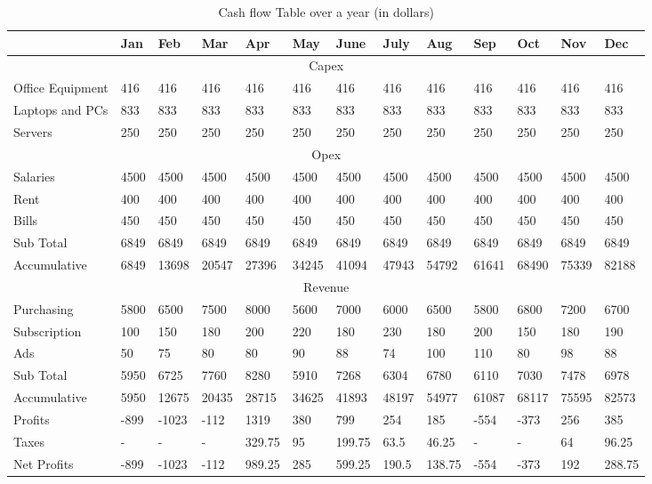 \begin{table}[H]
\centering
\caption{Cash flow Table over a year (in dollars)}
\begin{adjustbox}{angle=90}
\begin{tabular}[t]{ | l | l | l | l | l | l | l | l | l | l | l | l | l |}
\hline
 & Jan & Feb & Mar & Apr & May & June & July & Aug & Sep & Oct & Nov & Dec \\
\hline
\multicolumn{13}{|c|}{Capex}  \\
\hline
Office Equipment & 416 & 416 & 416 & 416 & 416 & 416 & 416 & 416 & 416 & 416 & 416 & 416 \\
\hline
Laptops and PCs & 833 & 833 & 833 & 833 & 833 & 833 & 833 & 833 & 833 & 833 & 833 & 833 \\
\hline
Servers & 250 & 250 & 250 & 250 & 250 & 250 & 250 & 250 & 250 & 250 & 250 & 250 \\
\hline
\multicolumn{13}{|c|}{Opex}  \\
\hline
Salaries & 4500 & 4500 & 4500 & 4500 & 4500 & 4500 & 4500 & 4500 & 4500 & 4500 & 4500 & 4500 \\
\hline
Rent & 400 & 400 & 400 & 400 & 400 & 400 & 400 & 400 & 400 & 400 & 400 & 400 \\
\hline
Bills & 450 & 450 & 450 & 450 & 450 & 450 & 450 & 450 & 450 & 450 & 450 & 450 \\
\hline
Sub Total & 6849 & 6849 & 6849 & 6849 & 6849 & 6849 & 6849 & 6849 & 6849 & 6849 & 6849 & 6849 \\
\hline
Accumulative & 6849 & 13698 & 20547 & 27396 & 34245 & 41094 & 47943 & 54792 & 61641 & 68490 & 75339 & 82188 \\
\hline
\multicolumn{13}{|c|}{Revenue}  \\
\hline
Purchasing & 5800 & 6500 & 7500 & 8000 & 5600 & 7000 & 6000 & 6500 & 5800 & 6800 & 7200 & 6700 \\
\hline
Subscription & 100 & 150 & 180 & 200 & 220 & 180 & 230 & 180 & 200 & 150 & 180 & 190 \\
\hline
Ads & 50 & 75 & 80 & 80 & 90 & 88 & 74 & 100 & 110 & 80 & 98 & 88 \\
\hline
Sub Total  & 5950 & 6725 & 7760 & 8280 & 5910 & 7268 & 6304 & 6780 & 6110 & 7030 & 7478 & 6978 \\
\hline
Accumulative & 5950 & 12675 & 20435 & 28715 & 34625 & 41893 & 48197 & 54977 & 61087 & 68117 & 75595 & 82573 \\
\hline
Profits & -899 & -1023 & -112 & 1319 & 380 & 799 & 254 & 185 & -554 & -373 & 256 & 385 \\
\hline
Taxes & - & - & - & 329.75 & 95 & 199.75 & 63.5 & 46.25 & - & - & 64 & 96.25 \\
\hline
Net Profits & -899 & -1023 & -112 & 989.25 & 285 & 599.25 & 190.5 & 138.75 & -554 & -373 & 192 & 288.75 \\
\hline
\end{tabular}
\end{adjustbox}
\label{tab:cash_flow}
\end{table}
